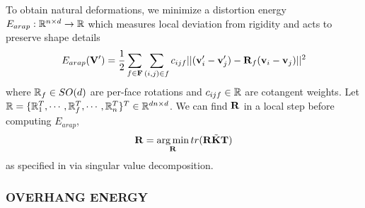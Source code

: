 To obtain natural deformations, we minimize a distortion energy $E_{arap}:  \mathbb{R}^{n \times d} \to \mathbb{R}$ which measures local deviation from rigidity and acts to preserve shape details~\cite{sorkine_arap_2007}
\[
    E_{arap}(\mathbf{V}') = \frac{1}{2} \sum_{f\in \mathbf{F}} \sum_{(i,j)\in f} c_{ijf} || (\mathbf{v}_i' - \mathbf{v}_j') - \mathbf{R}_f(\mathbf{v}_i - \mathbf{v}_j) ||^2
\]
where $\mathbb{R}_f \in SO(d)$ are per-face rotations and $c_{ijf}\in \mathbb{R}$ are cotangent weights. Let $\mathbb{R} = \{\mathbb{R}_1^T, \cdots, \mathbb{R}_f^T, \cdots, \mathbb{R}_n^T \}^T \in \mathbb{R}^{dn \times d}$. We can find $\mathbf{R}$ in a local step before computing $E_{arap}$,
\[
    \mathbf{R} = \operatorname*{arg\,min}_{\mathbf{R}} tr(\mathbf{R}\tilde{\mathbf{K}}\mathbf{T})
\]
as specified in \cite{jacobson_fast_2012} via singular value decomposition.

    

\subsubsection*{OVERHANG ENERGY}

